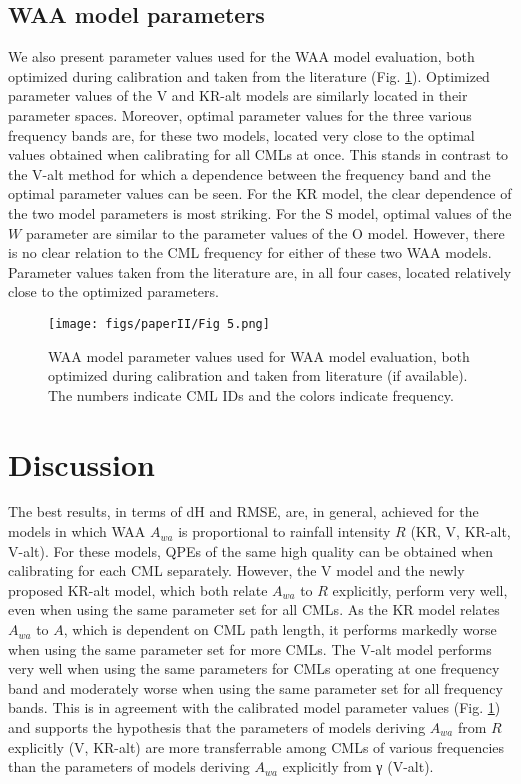 \documentclass{ctuthesis}\usepackage[]{graphicx}\usepackage[]{color}
\begin{document}
\subsection{WAA model parameters} \label{IIres3}

We also present parameter values used for the WAA model evaluation, both optimized during calibration and taken from the literature (Fig. \ref{fig:II_5}). Optimized parameter values of the V and KR-alt models are similarly located in their parameter spaces. Moreover, optimal parameter values for the three various frequency bands are, for these two models, located very close to the optimal values obtained when calibrating for all CMLs at once. This stands in contrast to the V-alt method for which a dependence between the frequency band and the optimal parameter values can be seen. For the KR model, the clear dependence of the two model parameters is most striking. For the S model, optimal values of the $W$ parameter are similar to the parameter values of the O model. However, there is no clear relation to the CML frequency for either of these two WAA models. Parameter values taken from the literature are, in all four cases, located relatively close to the optimized parameters.


\begin{figure}[h]
\begin{center}
\texttt{[image: figs/paperII/Fig 5.png]}
\caption{WAA model parameter values used for WAA model evaluation, both optimized during calibration and taken from literature (if available). The numbers indicate CML IDs and the colors indicate frequency.} 
\label{fig:II_5}
\end{center}
\end{figure}



\section{Discussion}

The best results, in terms of dH and RMSE, are, in general, achieved for the models in which WAA $A_{wa}$ is proportional to rainfall intensity $R$ (KR, V, KR-alt, V-alt). For these models, QPEs of the same high quality can be obtained when calibrating for each CML separately. However, the V model and the newly proposed KR-alt model, which both relate $A_{wa}$ to $R$ explicitly, perform very well, even when using the same parameter set for all CMLs. As the KR model relates $A_{wa}$ to $A$, which is dependent on CML path length, it performs markedly worse when using the same parameter set for more CMLs. The V-alt model performs very well when using the same parameters for CMLs operating at one frequency band and moderately worse when using the same parameter set for all frequency bands. This is in agreement with the calibrated model parameter values (Fig. \ref{fig:II_5}) and supports the hypothesis that the parameters of models deriving $A_{wa}$ from $R$ explicitly (V, KR-alt) are more transferrable among CMLs of various frequencies than the parameters of models deriving $A_{wa}$ explicitly from γ (V-alt).
\end{document}
